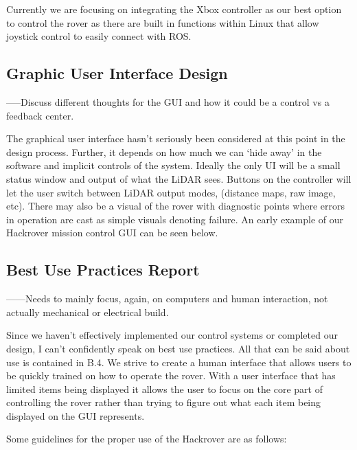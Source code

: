 \documentclass[a4paper, 10pt]{article}
\begin{document}
Currently we are focusing on integrating the Xbox controller as our best option to control the rover as there are built in functions within Linux that allow joystick control to easily connect with ROS. 


	\subsection{Graphic User Interface Design}
	-----Discuss different thoughts for the GUI and how it could be a control vs a feedback center.
	
	The graphical user interface hasn’t seriously been considered at this point in the design process. Further, it depends on how much we can ‘hide away’ in the software and implicit controls of the system. Ideally the only UI will be a small status window and output of what the LiDAR sees. Buttons on the controller will let the user switch between LiDAR output modes, (distance maps, raw image, etc). There may also be a visual of the rover with diagnostic points where errors in operation are cast as simple visuals denoting failure. An early example of our Hackrover mission control GUI can be seen below.
	

	\subsection{Best Use Practices Report}
	------Needs to mainly focus, again, on computers and human interaction, not actually mechanical or electrical build. 
	
	Since we haven't effectively implemented our control systems or completed our design, I can't confidently speak on best use practices. All that can be said about use is contained in B.4. We strive to create a human interface that allows users to be quickly trained on how to operate the rover. With a user interface that has limited items being displayed it allows the user to focus on the core part of controlling the rover rather than trying to figure out what each item being displayed on the GUI represents. 
	
	Some guidelines for the proper use of the Hackrover are as follows:
\end{document}
